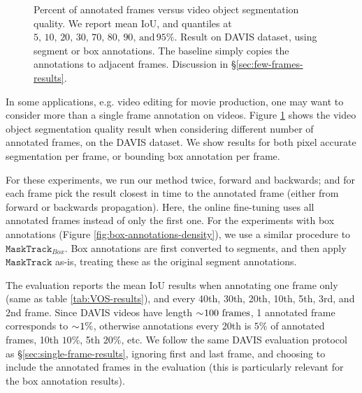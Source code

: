 \documentclass[10pt,twocolumn,letterpaper]{article}
\begin{document}
\begin{figure}
\hspace*{\fill}\hspace*{\fill}

\hspace*{\fill}\hspace*{\fill}
\caption{\label{fig:annotation-density}Percent of annotated frames versus
video object segmentation quality. We report mean IoU, and quantiles
at $5,\,10,\,20,\,30,\,70,\,80,\,90,\,\text{and}\,95\%$. Result on
DAVIS dataset, using segment or box annotations. The baseline simply
copies the annotations to adjacent frames.
Discussion in \S\ref{sec:few-frames-results}.
}\vspace{-1em}
\end{figure}

In some applications, e.g. video editing for movie production, one may want to consider more than a single frame annotation on videos. Figure \ref{fig:annotation-density} shows the video object segmentation quality
result when considering different number of annotated frames, on the DAVIS dataset. We show results for both pixel accurate segmentation per frame, or bounding box annotation per frame.

For these experiments, we run our method twice, forward and backwards; and for each frame pick the result closest in time to the annotated frame (either from forward or backwards propagation). Here,
the online fine-tuning uses all annotated frames instead of only the first one. For the experiments with box annotations (Figure \ref{fig:box-annotations-density}), we use a similar procedure to $\mathtt{MaskTrack}_{Box}$.
Box annotations are first converted to segments, and then apply $\mathtt{MaskTrack}$ as-is, treating these as the original segment annotations.

The evaluation reports the mean IoU results when annotating one frame only (same as table \ref{tab:VOS-results}), and every 40th, 30th, 20th, 10th, 5th, 3rd, and 2nd frame. Since DAVIS videos have length $\sim\negmedspace100\
\text{frames}$, 1 annotated frame corresponds to $\sim\negmedspace1\%$, otherwise annotations every 20th is $5\%$ of annotated frames, 10th $10\%$, 5th $20\%$, etc. We follow the same DAVIS evaluation protocol as
\S\ref{sec:single-frame-results}, ignoring first and last frame, and choosing to include the annotated frames in the evaluation (this is particularly relevant for the box annotation results).
\end{document}
